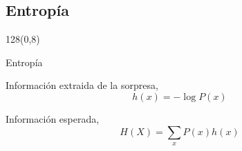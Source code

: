 \documentclass[shownotes]{beamer}
\begin{document}
\subsection{Entrop\'ia}
\begin{frame}
\begin{textblock}{128}(0,8)
\begin{center}
 \large Entrop\'ia 
\end{center}
\end{textblock} 
  \vspace{1.5cm}
  
  
  \pause
  
Informaci\'on extraida de la sorpresa, 
\begin{equation*}
 h(x) = -\log P(x)
\end{equation*}

\pause \vspace{0.75cm}

Informaci\'on esperada, 
\begin{equation*}
 H(X) = \sum_x P(x) h(x)
\end{equation*}

\pause

\vspace{0.3cm}

\centering


\end{frame}
\end{document}
